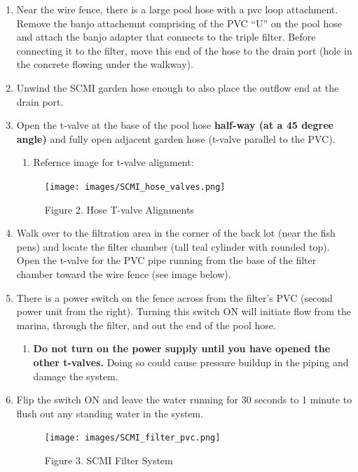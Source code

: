 \documentclass[
]{book}
\providecommand{\tightlist}{%
  \setlength{\itemsep}{0pt}\setlength{\parskip}{0pt}}
\begin{document}
\begin{enumerate}
\def\labelenumi{\arabic{enumi}.}
\item
  Near the wire fence, there is a large pool hose with a pvc loop attachment. Remove the banjo attachemnt comprising of the PVC ``U'' on the pool hose and attach the banjo adapter that connects to the triple filter. Before connecting it to the filter, move this end of the hose to the drain port (hole in the concrete flowing under the walkway).
\item
  Unwind the SCMI garden hose enough to also place the outflow end at the drain port.
\item
  Open the t-valve at the base of the pool hose \textbf{half-way (at a 45 degree angle)} and fully open adjacent garden hose (t-valve parallel to the PVC).

  \begin{enumerate}
  \def\labelenumii{\arabic{enumii}.}
  \tightlist
  \item
    Refernce image for t-valve alignment:
  \end{enumerate}

  \begin{figure}
  \centering
  \texttt{[image: images/SCMI\_hose\_valves.png]}
  \caption{Figure 2. Hose T-valve Alignments}
  \end{figure}
\item
  Walk over to the filtration area in the corner of the back lot (near the fish pens) and locate the filter chamber (tall teal cylinder with rounded top). Open the t-valve for the PVC pipe running from the base of the filter chamber toward the wire fence (see image below).
\item
  There is a power switch on the fence across from the filter's PVC (second power unit from the right). Turning this switch ON will initiate flow from the marina, through the filter, and out the end of the pool hose.

  \begin{enumerate}
  \def\labelenumii{\arabic{enumii}.}
  \tightlist
  \item
    \textbf{Do not turn on the power supply until you have opened the other t-valves.} Doing so could cause pressure buildup in the piping and damage the system.
  \end{enumerate}
\item
  Flip the switch ON and leave the water running for 30 seconds to 1 minute to flush out any standing water in the system.

  \begin{figure}
  \centering
  \texttt{[image: images/SCMI\_filter\_pvc.png]}
  \caption{Figure 3. SCMI Filter System}
  \end{figure}
\end{enumerate}
\end{document}
